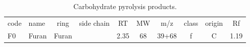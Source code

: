 \documentclass[preprint,review,12pt]{elsarticle}
\begin{document}
\newpage
\begin{table*}[h!]
\begin{center}
{\tiny
\begin{tabular}{llclcccccc}
code & name & ring & side chain & RT & MW & m/z & class & origin&Rf\\
F0&		Furan&				Furan&			&		2.35&		68&	39+68&		f&	C&	1.19\\
\hline
\end{tabular}}
\caption{Carbohydrate pyrolysis products.}
\end{center}
\label{tab:nprod}
\end{table*}
\end{document}
